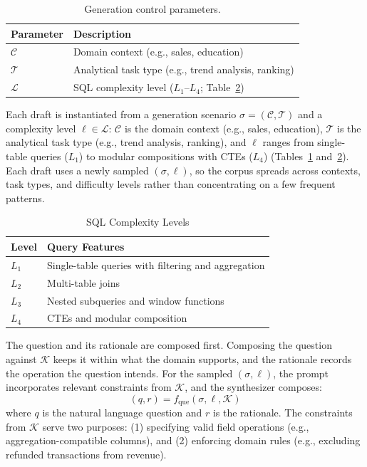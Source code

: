 \documentclass[letterpaper,journal]{IEEEtran}
\begin{document}
\begin{table}[!ht]
\centering
\caption{Generation control parameters.}
\label{tab:generation-config}
\footnotesize
\setlength{\tabcolsep}{8pt}
\begin{tabular}{ll}
\toprule
\textbf{Parameter} & \textbf{Description} \\
\midrule
$\mathcal{C}$ & Domain context (e.g., sales, education) \\
$\mathcal{T}$ & Analytical task type (e.g., trend analysis, ranking) \\
$\mathcal{L}$ & SQL complexity level ($L_1$--$L_4$; Table~\ref{tab:complexity-levels}) \\
\bottomrule
\end{tabular}
\end{table}

Each draft is instantiated from a generation scenario $\sigma = (\mathcal{C}, \mathcal{T})$ and a complexity level $\ell \in \mathcal{L}$: $\mathcal{C}$ is the domain context (e.g., sales, education), $\mathcal{T}$ is the analytical task type (e.g., trend analysis, ranking), and $\ell$ ranges from single-table queries ($L_1$) to modular compositions with CTEs ($L_4$) (Tables~\ref{tab:generation-config} and~\ref{tab:complexity-levels}). Each draft uses a newly sampled $(\sigma, \ell)$, so the corpus spreads across contexts, task types, and difficulty levels rather than concentrating on a few frequent patterns.

\begin{table}[!ht]
\centering
\caption{SQL Complexity Levels}
\label{tab:complexity-levels}
\footnotesize
\begin{tabular}{ll}
\toprule
\textbf{Level} & \textbf{Query Features} \\
\midrule
$L_1$ & Single-table queries with filtering and aggregation \\
$L_2$ & Multi-table joins \\
$L_3$ & Nested subqueries and window functions \\
$L_4$ & CTEs and modular composition \\
\bottomrule
\end{tabular}
\end{table}

The question and its rationale are composed first. Composing the question against $\mathcal{K}$ keeps it within what the domain supports, and the rationale records the operation the question intends. For the sampled $(\sigma, \ell)$, the prompt incorporates relevant constraints from $\mathcal{K}$, and the synthesizer composes:
\begin{equation}
(q, r) = f_{\text{que}}(\sigma, \ell, \mathcal{K})
\end{equation}
where $q$ is the natural language question and $r$ is the rationale. The constraints from $\mathcal{K}$ serve two purposes: (1) specifying valid field operations (e.g., aggregation-compatible columns), and (2) enforcing domain rules (e.g., excluding refunded transactions from revenue).
\end{document}
